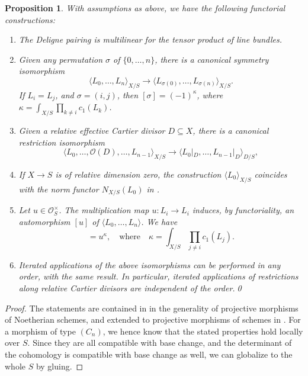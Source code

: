 \documentclass[11pt]{article}
\theoremstyle{plain}
\newtheorem{proposition}[theorem]{Proposition}
\theoremstyle{definition}
\newcommand{\Ocal}{\mathcal O}
\begin{document}
\begin{proposition}\label{prop:generalpropertiesdeligneproducts}
With assumptions as above, we have the following functorial constructions:

\begin{enumerate}
\item\label{item:Deligne-pairing-multilinear} The Deligne pairing is multilinear for the tensor product of line bundles.
\item\label{item:symmetry-deligne} Given any permutation $\sigma$ of $\lbrace 0,\ldots,n\rbrace$, there is a canonical symmetry isomorphism
\begin{equation}\label{eq:delignepairingsymmetry}
\langle L_0, \ldots,L_n\rangle_{X/S} \to \langle L_{\sigma(0)}, \ldots,L_{\sigma(n)}\rangle_{X/S}.
\end{equation}
If $L_i = L_j$, and $\sigma = (i,j)$, then $[\sigma] = (-1)^{\kappa}$, where $\kappa = \int_{X/S} \prod_{k\neq i} c_1(L_k)$.
\item\label{item:deligne-pairing-restriction} Given a relative effective Cartier divisor $D \subseteq X$, there is a canonical restriction isomorphism
\begin{equation}\label{eq:restrictiondivisor}
\langle L_{0},\ldots, \Ocal(D), \ldots, L_{n-1} \rangle_{X/S} \to \langle L_{0}|_D,\ldots,L_{n-1}|_D\rangle_{D/S},
\end{equation}
\item If $X\to S$ is of relative dimension zero, the construction $\langle L_{0} \rangle_{X/S}$ coincides with the norm functor $N_{X/S}(L_{0})$ in \cite[.5]{EGAII}.
\item\label{item:delmultiplicationbyu} Let $u \in \Ocal_S^\times$. The multiplication map $u: L_i \to L_i$ induces, by functoriality, an automorphism $[u]$ of $\langle L_0, \ldots, L_n \rangle $. We have
\begin{displaymath}
[u] = u^\kappa,\quad\text{where}\quad \kappa=\int_{X/S} \prod_{j\neq i}c_1(L_j).
\end{displaymath}
\item\label{item:order-deligne-pairing-isos} Iterated applications of the above isomorphisms can be performed in any order, with the same result. In particular, iterated applications of restrictions along relative Cartier divisors are independent of the order.\qed
\end{enumerate}
\end{proposition}

\begin{proof}
The statements are contained in \cite{Ducrot} in the generality of projective morphisms of Noetherian schemes, and extended to projective morphisms of schemes in \cite[App.]{Boucksom-Eriksson}. For a morphism of type $(C_{n})$, we hence know that the stated properties hold locally over $S$. Since they are all compatible with base change, and the determinant of the cohomology is compatible with base change as well, we can globalize to the whole $S$ by gluing.
\end{proof}
\end{document}
